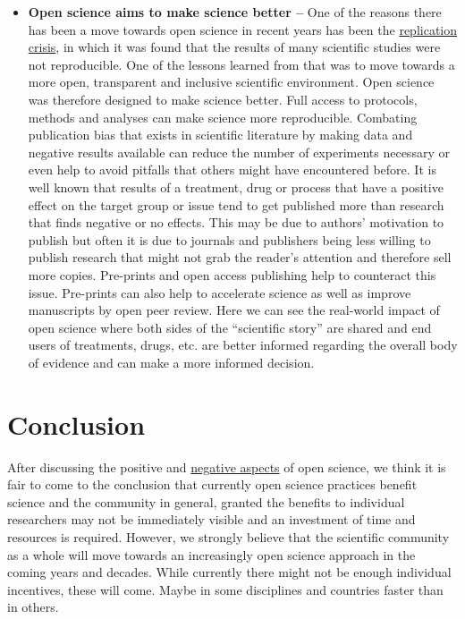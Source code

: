 \documentclass[
]{book}
\begin{document}
\begin{itemize}
\item
  \textbf{Open science aims to make science better --} One of the reasons there has been a move towards open science in recent years has been the \href{https://en.wikipedia.org/wiki/Replication_crisis}{replication crisis}, in which it was found that the results of many scientific studies were not reproducible. One of the lessons learned from that was to move towards a more open, transparent and inclusive scientific environment. Open science was therefore designed to make science better. Full access to protocols, methods and analyses can make science more reproducible. Combating publication bias that exists in scientific literature by making data and negative results available can reduce the number of experiments necessary or even help to avoid pitfalls that others might have encountered before. It is well known that results of a treatment, drug or process that have a positive effect on the target group or issue tend to get published more than research that finds negative or no effects. This may be due to authors' motivation to publish but often it is due to journals and publishers being less willing to publish research that might not grab the reader's attention and therefore sell more copies. Pre-prints and open access publishing help to counteract this issue. Pre-prints can also help to accelerate science as well as improve manuscripts by open peer review. Here we can see the real-world impact of open science where both sides of the ``scientific story'' are shared and end users of treatments, drugs, etc. are better informed regarding the overall body of evidence and can make a more informed decision.
\end{itemize}

\hypertarget{conclusion}{%
\section{Conclusion}\label{conclusion}}

After discussing the positive and \href{https://www.pygaze.org/2016/03/the-downsides-of-open-science-that-nobody-talks-about/}{negative aspects} of open science, we think it is fair to come to the conclusion that currently open science practices benefit science and the community in general, granted the benefits to individual researchers may not be immediately visible and an investment of time and resources is required. However, we strongly believe that the scientific community as a whole will move towards an increasingly open science approach in the coming years and decades. While currently there might not be enough individual incentives, these will come. Maybe in some disciplines and countries faster than in others.
\end{document}

